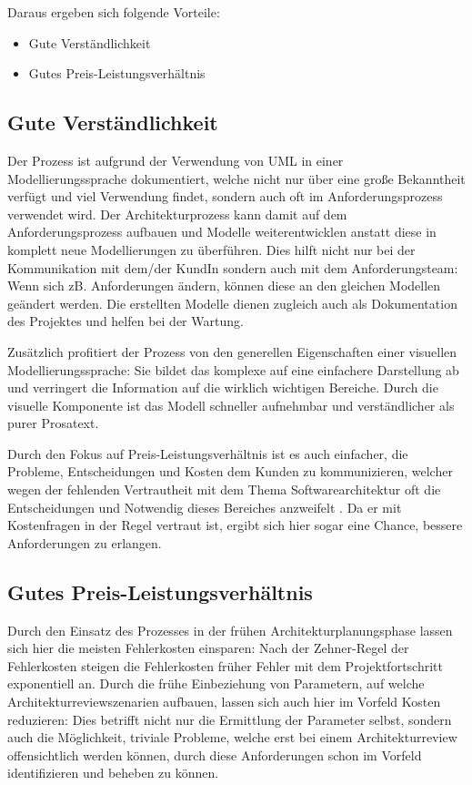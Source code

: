 Daraus ergeben sich folgende Vorteile:

\begin{itemize}
  \item Gute Verständlichkeit
  \item Gutes Preis-Leistungsverhältnis
\end{itemize}

\subsection{Gute Verständlichkeit}
Der Prozess ist aufgrund der Verwendung von UML in einer Modellierungssprache dokumentiert, welche nicht nur über eine große Bekanntheit verfügt und viel Verwendung findet, sondern auch oft im Anforderungsprozess verwendet wird. Der Architekturprozess kann damit auf dem Anforderungsprozess aufbauen und Modelle weiterentwicklen anstatt diese in komplett neue Modellierungen zu überführen. Dies hilft nicht nur bei der Kommunikation mit dem/der KundIn sondern auch mit dem Anforderungsteam: Wenn sich zB. Anforderungen ändern, können diese an den gleichen Modellen geändert werden. Die erstellten Modelle dienen zugleich auch als Dokumentation des Projektes und helfen bei der Wartung.

Zusätzlich profitiert der Prozess von den generellen Eigenschaften einer visuellen Modellierungssprache: Sie bildet das komplexe auf eine einfachere Darstellung ab und verringert die Information auf die wirklich wichtigen Bereiche. Durch die visuelle Komponente ist das Modell schneller aufnehmbar und verständlicher als purer Prosatext.

Durch den Fokus auf Preis-Leistungsverhältnis ist es auch einfacher, die Probleme, Entscheidungen und Kosten dem Kunden zu kommunizieren, welcher wegen der fehlenden Vertrautheit mit dem Thema Softwarearchitektur oft die Entscheidungen und Notwendig dieses Bereiches anzweifelt \cite[S. 8-9]{softarch}. Da er mit Kostenfragen in der Regel vertraut ist, ergibt sich hier sogar eine Chance, bessere Anforderungen zu erlangen.

\subsection{Gutes Preis-Leistungsverhältnis}
Durch den Einsatz des Prozesses in der frühen Architekturplanungsphase lassen sich hier die meisten Fehlerkosten einsparen: Nach der Zehner-Regel der Fehlerkosten steigen die Fehlerkosten früher Fehler mit dem Projektfortschritt exponentiell an. Durch die frühe Einbeziehung von Parametern, auf welche  Architekturreviewszenarien aufbauen, lassen sich auch hier im Vorfeld Kosten reduzieren: Dies betrifft nicht nur die Ermittlung der Parameter selbst, sondern auch die Möglichkeit, triviale Probleme, welche erst bei einem Architekturreview offensichtlich werden können, durch diese Anforderungen schon im Vorfeld identifizieren und beheben zu können.

